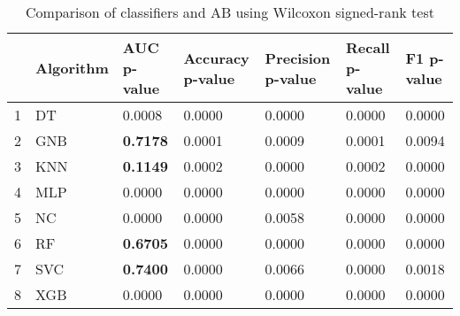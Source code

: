\begin{table}
\footnotesize
\caption{Comparison of classifiers and AB using Wilcoxon signed-rank test}
\label{tab:wilcoxon comparison}
\begin{tabular}{lllllll}
\hline
 & Algorithm & AUC p-value & Accuracy p-value & Precision p-value & Recall p-value & F1 p-value \\
\hline
1 & DT & 0.0008 & 0.0000 & 0.0000 & 0.0000 & 0.0000 \\
2 & GNB & \textbf{0.7178} & 0.0001 & 0.0009 & 0.0001 & 0.0094 \\
3 & KNN & \textbf{0.1149} & 0.0002 & 0.0000 & 0.0002 & 0.0000 \\
4 & MLP & 0.0000 & 0.0000 & 0.0000 & 0.0000 & 0.0000 \\
5 & NC & 0.0000 & 0.0000 & 0.0058 & 0.0000 & 0.0000 \\
6 & RF & \textbf{0.6705} & 0.0000 & 0.0000 & 0.0000 & 0.0000 \\
7 & SVC & \textbf{0.7400} & 0.0000 & 0.0066 & 0.0000 & 0.0018 \\
8 & XGB & 0.0000 & 0.0000 & 0.0000 & 0.0000 & 0.0000 \\
\hline
\end{tabular}
\end{table}
